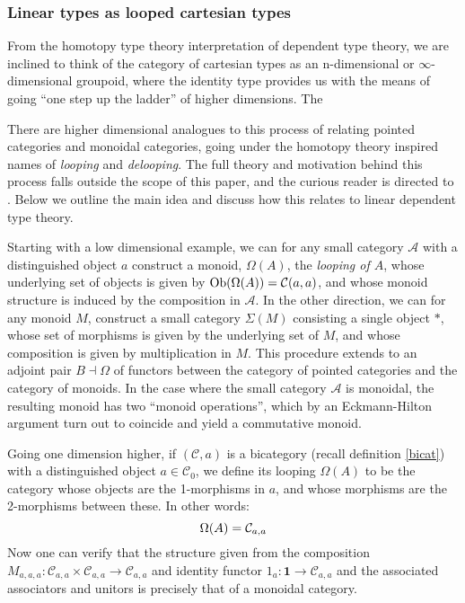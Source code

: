 \subsubsection{Linear types as looped cartesian types}
From the homotopy type theory interpretation of dependent type theory, we are inclined to think of the category of cartesian types as an n-dimensional or $\infty$-dimensional groupoid, where the identity type provides us with the means of going ``one step up the ladder'' of higher dimensions. The 

There are higher dimensional analogues to this process of relating pointed categories and monoidal categories, going under the homotopy theory inspired names of \textit{looping} and \textit{delooping}. The full theory and motivation behind this process falls outside the scope of this paper, and the curious reader is directed to \cite{n-cats}. Below we outline the main idea and discuss how this relates to linear dependent type theory.

Starting with a low dimensional example, we can for any small category $\mathcal{A}$ with a distinguished object $a$ construct a monoid, $\Omega(A)$, the \textit{looping of $A$}, whose underlying set of objects is given by $\operatorname{\text{Ob}}(\Omega(A)) = \mathcal{C}(a,a)$, and whose monoid structure is induced by the composition in $\mathcal{A}$. In the other direction, we can for any monoid $M$, construct a small category $\Sigma(M)$ consisting a single object $*$, whose set of morphisms is given by the underlying set of $M$, and whose composition is given by multiplication in $M$. This procedure extends to an adjoint pair $B \dashv \Omega$ of functors between the category of pointed categories and the category of monoids.
In the case where the small category $\mathcal{A}$ is monoidal, the resulting monoid has two ``monoid operations'', which by an Eckmann-Hilton argument turn out to coincide and yield a commutative monoid.

Going one dimension higher, if $(\mathcal{C}, a)$ is a bicategory (recall definition \ref{bicat}) with a distinguished object $a \in \mathcal{C}_0$, we define its looping $\Omega(A)$ to be the category whose objects are the 1-morphisms in $a$, and whose morphisms are the 2-morphisms between these. In other words:
\[
  \Omega(A) = \mathcal{C}_{a,a}\\
\]
Now one can verify that the structure given from the composition $M_{a,a,a} : \mathcal{C}_{a,a} \times \mathcal{C}_{a,a} \to \mathcal{C}_{a,a}$ and identity functor $1_a : \mathbf{1} \to \mathcal{C}_{a,a}$ and the associated associators and unitors is precisely that of a monoidal category.

